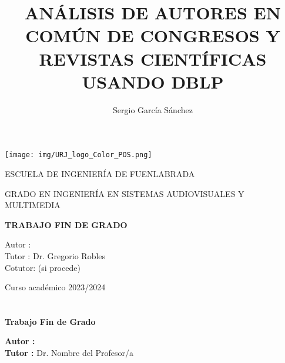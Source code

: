 \documentclass[a4paper, 12pt]{book}
\title{ANÁLISIS DE AUTORES EN COMÚN DE CONGRESOS Y REVISTAS CIENTÍFICAS USANDO DBLP}
\author{Sergio García Sánchez}
\makeatletter
\let\thetitle\@title
\let\theauthor\@author
\makeatother
\begin{document}
\renewcommand{\refname}{Bibliografía}  %
\renewcommand{\appendixname}{Apéndice}



\begin{titlepage}
\begin{center}
\texttt{[image: img/URJ\_logo\_Color\_POS.png]}

\vspace{1.75cm}

\LARGE
ESCUELA DE INGENIERÍA DE FUENLABRADA
\vspace{1cm}

\LARGE
GRADO EN INGENIERÍA EN SISTEMAS AUDIOVISUALES Y MULTIMEDIA

\vspace{1cm}
\LARGE
\textbf{TRABAJO FIN DE GRADO}

\vspace{2cm}

\Large
\MakeUppercase{\thetitle}

\vspace{2cm}

\large
Autor : \theauthor \\
Tutor : Dr. Gregorio Robles\\
Cotutor: (si procede)
\vspace{1cm}

\large
Curso académico 2023/2024

\end{center}
\end{titlepage}

\newpage
\mbox{}
\thispagestyle{empty} %



\clearpage
{}
\chapter*{}

\vspace{-4cm}
\begin{center}
\LARGE
\textbf{Trabajo Fin de Grado}

\vspace{1cm}
\large
\thetitle

\vspace{0.8cm}
\large
\textbf{Autor :} \theauthor \\
\textbf{Tutor :} Dr. Nombre del Profesor/a

\end{center}
\end{document}
